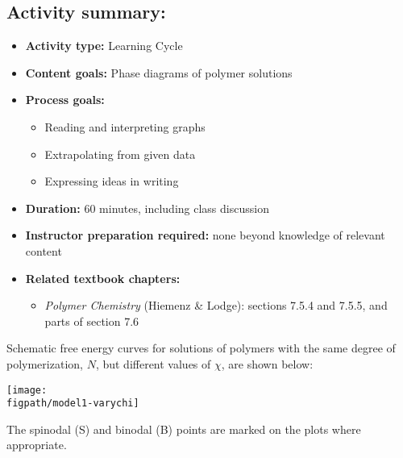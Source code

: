 \begin{activity}
\begin{instructornotes}
	\subsection*{Activity summary:}
	\begin{itemize}
		\item \textbf{Activity type:} Learning Cycle
		\item \textbf{Content goals:} Phase diagrams of polymer solutions
		\item \textbf{Process goals:} %
			\begin{itemize}
				\item Reading and interpreting graphs
				\item Extrapolating from given data
				\item Expressing ideas in writing
			\end{itemize}
		\item \textbf{Duration:} 60 minutes, including class discussion
		\item \textbf{Instructor preparation required:} none beyond knowledge of relevant content
		\item \textbf{Related textbook chapters:}
			\begin{itemize}
				\item \emph{Polymer Chemistry} (Hiemenz \& Lodge): sections 7.5.4 and 7.5.5, and parts of section 7.6
			\end{itemize}
	\end{itemize}

\end{instructornotes}



\begin{model}
\label{\labelbase:mdl:spinodalbinodal}

	Schematic free energy curves for solutions of polymers with the same degree of polymerization, $N$, but different values of $\chi$, are shown below:
	
	\centerline{\texttt{[image: \\figpath/model1-varychi]}}
	
	The spinodal (S) and binodal (B) points are marked on the plots where appropriate.
\end{model}

\begin{ctqs}


\end{ctqs}
\end{activity}
